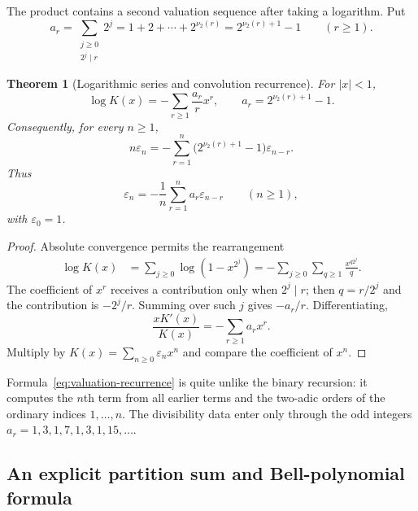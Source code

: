 \documentclass[11pt,oneside]{article}
\newtheorem{theorem}{Theorem}[section]
\theoremstyle{definition}
\theoremstyle{remark}
\newcommand{\vtwo}{\nu_2}
\begin{document}
The product contains a second valuation sequence after taking a logarithm.  Put
\begin{equation}
  a_r=\sum_{\substack{j\ge0\\2^j\mid r}}2^j
     =1+2+\cdots+2^{\vtwo(r)}
     =2^{\vtwo(r)+1}-1
  \qquad(r\ge1).                                           \label{eq:ar-definition}
\end{equation}

\begin{theorem}[Logarithmic series and convolution recurrence]
\label{thm:logarithmic-recurrence}
For $|x|<1$,
\begin{equation}
  \boxed{\displaystyle
  \log K(x)=-\sum_{r\ge1}\frac{a_r}{r}x^r,
  \qquad a_r=2^{\vtwo(r)+1}-1.}                            \label{eq:log-K}
\end{equation}
Consequently, for every $n\ge1$,
\begin{equation}
  \boxed{\displaystyle
  n\varepsilon_n
   =-\sum_{r=1}^{n}\bigl(2^{\vtwo(r)+1}-1\bigr)
        \varepsilon_{n-r}.}                                \label{eq:valuation-convolution}
\end{equation}
Thus
\begin{equation}
  \varepsilon_n=-\frac1n\sum_{r=1}^{n}a_r\varepsilon_{n-r}
  \qquad(n\ge1),                                          \label{eq:valuation-recurrence}
\end{equation}
with $\varepsilon_0=1$.
\end{theorem}

\begin{proof}
Absolute convergence permits the rearrangement
\begin{align*}
 \log K(x)
 &=\sum_{j\ge0}\log(1-x^{2^j})
  =-\sum_{j\ge0}\sum_{q\ge1}\frac{x^{q2^j}}q.
\end{align*}
The coefficient of $x^r$ receives a contribution only when $2^j\mid r$; then
$q=r/2^j$ and the contribution is $-2^j/r$.  Summing over such $j$ gives
$-a_r/r$.  Differentiating,
\[
 \frac{xK'(x)}{K(x)}=-\sum_{r\ge1}a_rx^r.
\]
Multiply by $K(x)=\sum_{n\ge0}\varepsilon_nx^n$ and compare the coefficient of
$x^n$.
\end{proof}

Formula~\eqref{eq:valuation-recurrence} is quite unlike the binary recursion:
it computes the $n$th term from all earlier terms and the two-adic orders of the
ordinary indices $1,\ldots,n$.  The divisibility data enter only through the odd
integers $a_r=1,3,1,7,1,3,1,15,\ldots$.

\subsection{An explicit partition sum and Bell-polynomial formula}
\end{document}

